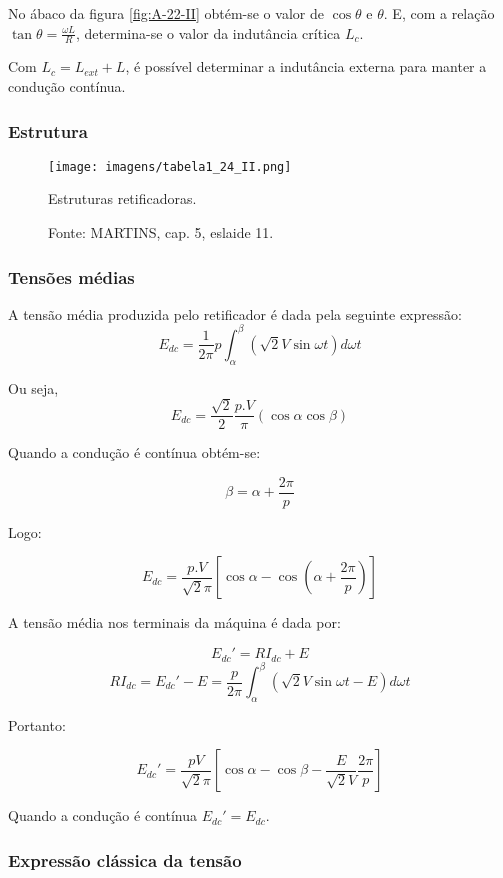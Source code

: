 No ábaco da figura \ref{fig:A-22-II} obtém-se o valor de $\cos{\theta}$ e $\theta$. E, com a relação $\tan{\theta} = \frac{\omega{L}}{R}$, determina-se o valor da indutância crítica $L_{c}$.

Com $L_{c} = L_{ext} + L$, é possível determinar a indutância externa para manter a condução contínua.

\subsubsection{Estrutura}

\begin{figure}[ht!]
\center
\texttt{[image: imagens/tabela1\_24\_II.png]}
\caption{\label{fig:T-24-II} Estruturas retificadoras.}
\caption*{Fonte: MARTINS, cap. 5, eslaide 11.}
\end{figure}

\subsubsection{Tensões médias}

A tensão média produzida pelo retificador é dada pela seguinte expressão:
\[E_{dc} = \frac{1}{2\pi}{p} \int_{\alpha}^{\beta}\left(\sqrt{2}V\sin{\omega{t}}\right)d\omega{t}\]

Ou seja,
\[E_{dc} = \frac{\sqrt{2}}{2}\frac{p.V}{\pi}\left(\cos{\alpha} \cos{\beta}\right)\]

Quando a condução é contínua obtém-se:

\[\beta = \alpha + \frac{2\pi}{p}\]

Logo:

\[E_{dc} = \frac{p.V}{\sqrt{2}\pi}\left[\cos{\alpha} - \cos{\left(\alpha + \frac{2\pi}{p}\right)}\right]\]

A tensão média nos terminais da máquina é dada por:

\[E_{dc}' = RI_{dc} + E \]
\[RI_{dc} = E_{dc}' - E = \frac{p}{2\pi}\int_{\alpha}^{\beta}\left(\sqrt{2}V\sin{\omega{t} - E}\right)d\omega{t} \]

Portanto:

\[E_{dc}' = \frac{pV}{\sqrt{2}\pi}\left[\cos{\alpha} - \cos{\beta} - \frac{E}{\sqrt{2}V}\frac{2\pi}{p}\right]\]

Quando a condução é contínua $E_{dc}' = E_{dc}$.

\subsubsection{Expressão clássica da tensão}

